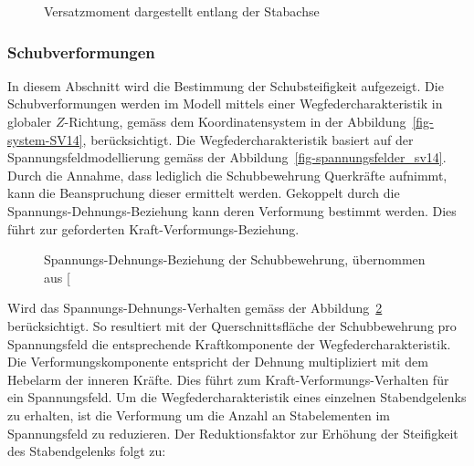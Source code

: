 \documentclass[
  11pt,
  letterpaper,
]{scrreprt}
\begin{document}
\begin{figure}[H]


\caption{\label{fig-versatzmoment_sv14}Versatzmoment dargestellt entlang
der Stabachse}

\end{figure}%

\subsubsection{Schubverformungen}\label{schubverformungen-1}

In diesem Abschnitt wird die Bestimmung der Schubsteifigkeit aufgezeigt.
Die Schubverformungen werden im Modell mittels einer
Wegfedercharakteristik in globaler \(Z\)-Richtung, gemäss dem
Koordinatensystem in der Abbildung~\ref{fig-system-SV14},
berücksichtigt. Die Wegfedercharakteristik basiert auf der
Spannungsfeldmodellierung gemäss der
Abbildung~\ref{fig-spannungsfelder_sv14}. Durch die Annahme, dass
lediglich die Schubbewehrung Querkräfte aufnimmt, kann die Beanspruchung
dieser ermittelt werden. Gekoppelt durch die
Spannungs-Dehnungs-Beziehung kann deren Verformung bestimmt werden. Dies
führt zur geforderten Kraft-Verformungs-Beziehung.

\begin{figure}[H]


\caption{\label{fig-sigma-epsilon-sv14}Spannungs-Dehnungs-Beziehung der
Schubbewehrung, übernommen aus
{[}\citeproc{ref-gitz_ansatze_2024}{1}{]}}

\end{figure}%

Wird das Spannungs-Dehnungs-Verhalten gemäss der
Abbildung~\ref{fig-sigma-epsilon-sv14} berücksichtigt. So resultiert mit
der Querschnittsfläche der Schubbewehrung pro Spannungsfeld die
entsprechende Kraftkomponente der Wegfedercharakteristik. Die
Verformungskomponente entspricht der Dehnung multipliziert mit dem
Hebelarm der inneren Kräfte. Dies führt zum Kraft-Verformungs-Verhalten
für ein Spannungsfeld. Um die Wegfedercharakteristik eines einzelnen
Stabendgelenks zu erhalten, ist die Verformung um die Anzahl an
Stabelementen im Spannungsfeld zu reduzieren. Der Reduktionsfaktor zur
Erhöhung der Steifigkeit des Stabendgelenks folgt zu:
\end{document}
